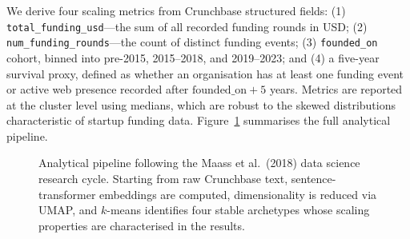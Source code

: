 \documentclass[review,12pt]{elsarticle}
\begin{document}
We derive four scaling metrics from Crunchbase structured fields:
(1) \texttt{total\_funding\_usd}---the sum of all recorded funding
rounds in USD; (2) \texttt{num\_funding\_rounds}---the count of
distinct funding events; (3) \texttt{founded\_on} cohort, binned
into pre-2015, 2015--2018, and 2019--2023; and (4) a five-year
survival proxy, defined as whether an organisation has at least one
funding event or active web presence recorded after
$\text{founded\_on} + 5$ years. Metrics are reported at the cluster
level using medians, which are robust to the skewed distributions
characteristic of startup funding data. Figure~\ref{fig:pipeline}
summarises the full analytical pipeline.


\begin{figure}[htbp]
\centering
{}
\caption{Analytical pipeline following the Maass et al.\ (2018) data science research cycle. Starting from raw Crunchbase text, sentence-transformer embeddings are computed, dimensionality is reduced via UMAP, and $k$-means identifies four stable archetypes whose scaling properties are characterised in the results.}
\label{fig:pipeline}
\end{figure}
\end{document}

